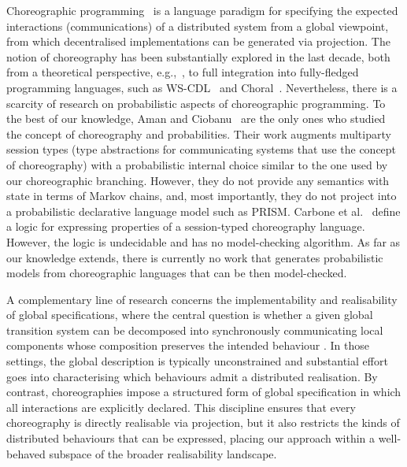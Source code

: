 %
  Choreographic programming~\cite{M23} is a
language paradigm for specifying the expected interactions
(communications) of a distributed system from a global viewpoint,
from which decentralised implementations can be generated via
projection. The notion of choreography has been substantially explored
in the last decade, both from a theoretical perspective,
e.g.,~\cite{CHY12,CM13}, to full integration into fully-fledged
programming languages, such as WS-CDL~\cite{HYC07b} and
Choral~\cite{GMP24}. Nevertheless, there is a scarcity of research on
probabilistic aspects of choreographic programming.
%
To the best of our knowledge, Aman and Ciobanu~\cite{AC19,AC22} are
the only ones who studied the concept of choreography and
probabilities. Their work augments multiparty session types (type
abstractions for communicating systems that use the concept of
choreography) with a probabilistic internal choice similar to the one
used by our choreographic branching. However, they do not provide any
semantics with state in terms of Markov chains, and, most importantly,
they do not project into a probabilistic declarative language model
such as PRISM.
%
Carbone et al.~\cite{CGHL10} define a logic for expressing properties
of a session-typed choreography language. However, the logic is
undecidable and has no model-checking algorithm. %
%
As far as our knowledge extends, there is currently no work that
generates probabilistic models from choreographic languages that can
be then model-checked.

{ A complementary line of research concerns the implementability and
  realisability of global specifications, where the central question
  is whether a given global transition system can be decomposed into
  synchronously communicating local components whose composition
  preserves the intended behaviour \cite{10.1007/3-540-46691-6_17,
    Mukund2002, 10.1007/978-3-031-47963-2_15,
    10.1007/978-3-031-62697-5_10}.  In those settings, the global
  description is typically unconstrained and substantial effort goes
  into characterising which behaviours admit a distributed
  realisation.  By contrast, choreographies impose a structured form
  of global specification in which all interactions are explicitly
  declared.  This discipline ensures that every choreography is
  directly realisable via projection, but it also restricts the kinds
  of distributed behaviours that can be expressed, placing our
  approach within a well-behaved subspace of the broader realisability
  landscape.  }


